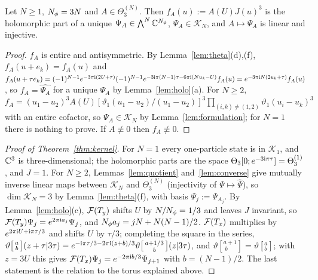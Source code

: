 \begin{lemma}\label{lem:converse}
Let $N\ge1$, $N_{\phi}=3N$ and $A\in\Theta_3^{(N)}$. Then $f_A(u):=A(U)J(u)^3$ is the holomorphic part of a unique
$\Psi_A\in\bigwedge^N\mathbb{C}^{N_{\phi}}$, $\Psi_A\in\mathcal K_N$, and $A\mapsto\Psi_A$ is linear and injective.
\end{lemma}

\begin{proof}
$f_A$ is entire and antisymmetric. By Lemma~\ref{lem:theta}(d),(f), $f_A(u+e_k)=f_A(u)$ and
$f_A(u+\tau e_k)=(-1)^{N-1}e^{-3\pi\mathrm{i}(2U+\tau)}(-1)^{N-1}e^{-3\mathrm{i}\pi(N-1)\tau-6\pi\mathrm{i}(Nu_k-U)}f_A(u)=e^{-3\pi\mathrm{i} N(2u_k+\tau)}f_A(u)$,
so $f_A=\widehat{\Psi_A}$ for a unique $\Psi_A$ by Lemma~\ref{lem:holo}(a). For $N\ge2$,
$f_A=(u_1-u_2)^3A(U)[\vartheta_1(u_1-u_2)/(u_1-u_2)]^3\prod_{(i,k)\neq(1,2)}\vartheta_1(u_i-u_k)^3$ with an entire cofactor, so
$\Psi_A\in\mathcal K_N$ by Lemma~\ref{lem:formulation}; for $N=1$ there is nothing to prove. If $A\not\equiv0$ then $f_A\not\equiv0$.
\end{proof}

\begin{proof}[Proof of Theorem~\ref{thm:kernel}]
For $N=1$ every one-particle state is in $\mathcal K_1$, and $\mathbb{C}^{3}$ is three-dimensional; the holomorphic parts are the
space $\Theta_3[0;e^{-3\mathrm{i}\pi\tau}]=\Theta_3^{(1)}$, and $J=1$. For $N\ge2$, Lemmas~\ref{lem:quotient} and~\ref{lem:converse} give
mutually inverse linear maps between $\mathcal K_N$ and $\Theta_3^{(N)}$ (injectivity of $\Psi\mapsto\widehat\Psi$), so
$\dim\mathcal K_N=3$ by Lemma~\ref{lem:theta}(f), with basis $\Psi_j:=\Psi_{A_j}$. By Lemma~\ref{lem:holo}(c),
$\mathcal{F}(T_y)$ shifts $U$ by $N/N_{\phi}=1/3$ and leaves $J$ invariant, so $\mathcal{F}(T_y)\Psi_j=e^{2\pi\mathrm{i} a_j}\Psi_j$, and
$N_{\phi} a_j=jN+N(N-1)/2$. $\mathcal{F}(T_x)$ multiplies by $e^{2\pi\mathrm{i} U+\mathrm{i}\pi\tau/3}$ and shifts $U$ by $\tau/3$; completing the square in
the series,
$\vartheta\bigl[\begin{smallmatrix}a\\b\end{smallmatrix}\bigr](z+\tau|3\tau)=e^{-\mathrm{i}\pi\tau/3-2\pi\mathrm{i}(z+b)/3}\vartheta\bigl[\begin{smallmatrix}a+1/3\\b\end{smallmatrix}\bigr](z|3\tau)$,
and $\vartheta[{}^{a+1}_{\;b}]=\vartheta[{}^a_b]$; with $z=3U$ this gives $\mathcal{F}(T_x)\Psi_j=e^{-2\pi\mathrm{i} b/3}\Psi_{j+1}$ with
$b=(N-1)/2$. The last statement is the relation to the torus explained above.
\end{proof}

